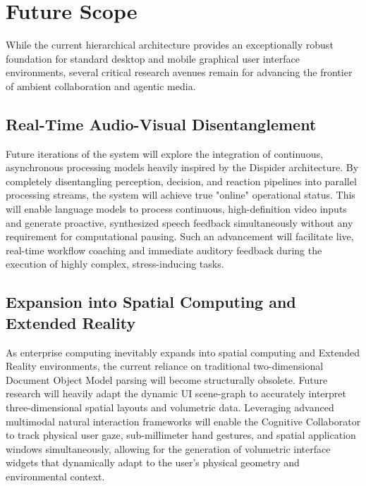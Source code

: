 \documentclass[12pt, a4paper]{report}
\begin{document}
\section{Future Scope}
While the current hierarchical architecture provides an exceptionally robust foundation for standard desktop and mobile graphical user interface environments, several critical research avenues remain for advancing the frontier of ambient collaboration and agentic media.

\subsection{Real-Time Audio-Visual Disentanglement}
Future iterations of the system will explore the integration of continuous, asynchronous processing models heavily inspired by the Dispider architecture.\cite{hojo2025} By completely disentangling perception, decision, and reaction pipelines into parallel processing streams, the system will achieve true "online" operational status. This will enable language models to process continuous, high-definition video inputs and generate proactive, synthesized speech feedback simultaneously without any requirement for computational pausing.\cite{hojo2025} Such an advancement will facilitate live, real-time workflow coaching and immediate auditory feedback during the execution of highly complex, stress-inducing tasks.

\subsection{Expansion into Spatial Computing and Extended Reality}
As enterprise computing inevitably expands into spatial computing and Extended Reality environments, the current reliance on traditional two-dimensional Document Object Model parsing will become structurally obsolete.\cite{hojo2025} Future research will heavily adapt the dynamic UI scene-graph to accurately interpret three-dimensional spatial layouts and volumetric data. Leveraging advanced multimodal natural interaction frameworks will enable the Cognitive Collaborator to track physical user gaze, sub-millimeter hand gestures, and spatial application windows simultaneously, allowing for the generation of volumetric interface widgets that dynamically adapt to the user's physical geometry and environmental context.\cite{hojo2025}
\end{document}
